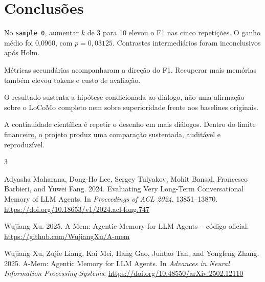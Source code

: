 \documentclass[sigconf]{acmart}
\begin{document}
\section{Conclusões}

No \texttt{sample 0}, aumentar \(k\) de 3 para 10 elevou o F1 nas cinco repetições. O ganho médio foi 0,0960, com \(p=0,03125\). Contrastes intermediários foram inconclusivos após Holm.

Métricas secundárias acompanharam a direção do F1. Recuperar mais memórias também elevou tokens e custo de avaliação.

O resultado sustenta a hipótese condicionada ao diálogo, não uma afirmação sobre o LoCoMo completo nem sobre superioridade frente aos baselines originais.

A continuidade científica é repetir o desenho em mais diálogos. Dentro do limite financeiro, o projeto produz uma comparação sustentada, auditável e reproduzível.


\begin{thebibliography}{3}

Adyasha Maharana, Dong-Ho Lee, Sergey Tulyakov, Mohit Bansal, Francesco Barbieri, and Yuwei Fang. 2024.
Evaluating Very Long-Term Conversational Memory of LLM Agents.
In \textit{Proceedings of ACL 2024}, 13851--13870.
\url{https://doi.org/10.18653/v1/2024.acl-long.747}

Wujiang Xu. 2025.
A-Mem: Agentic Memory for LLM Agents -- código oficial.
\url{https://github.com/WujiangXu/A-mem}

Wujiang Xu, Zujie Liang, Kai Mei, Hang Gao, Juntao Tan, and Yongfeng Zhang. 2025.
A-Mem: Agentic Memory for LLM Agents.
In \textit{Advances in Neural Information Processing Systems}.
\url{https://doi.org/10.48550/arXiv.2502.12110}

\end{thebibliography}
\end{document}
